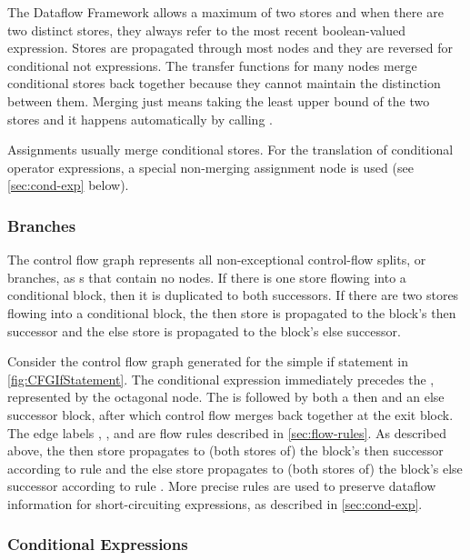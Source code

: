 The Dataflow Framework allows a maximum of two stores and when there
are two distinct stores, they always refer to the most recent
boolean-valued expression.  Stores are propagated through most nodes
and they are reversed for conditional not expressions.  The transfer
functions for many nodes merge conditional stores back together
because they cannot maintain the distinction between them.  Merging
just means taking the least upper bound of the two stores and it
happens automatically by calling .

Assignments usually merge conditional stores. For the translation of
conditional operator expressions, a special non-merging assignment
node is used (see \autoref{sec:cond-exp} below).

\subsubsection{Branches}

The control flow graph represents all non-exceptional control-flow
splits, or branches, as s that contain no
nodes.  If there is one store flowing into a conditional block, then
it is duplicated to both successors.  If there are two stores flowing
into a conditional block, the then store is propagated to the block's
then successor and the else store is propagated to the block's else
successor.

Consider the control flow graph generated for the simple if statement
in \autoref{fig:CFGIfStatement}.  The conditional expression 
immediately precedes the , represented by the
octagonal node.  The  is followed by both a
then and an else successor block, after which control flow merges back
together at the exit block.  The edge labels ,
, and  are flow rules described
in \autoref{sec:flow-rules}.  As described above, the then store
propagates to (both stores of) the block's then successor according to
rule  and the else store propagates to (both stores
of) the block's else successor according to rule .
More precise rules are used to preserve dataflow information for
short-circuiting expressions, as described in \autoref{sec:cond-exp}.


\subsubsection{Conditional Expressions}
\label{sec:cond-exp}

